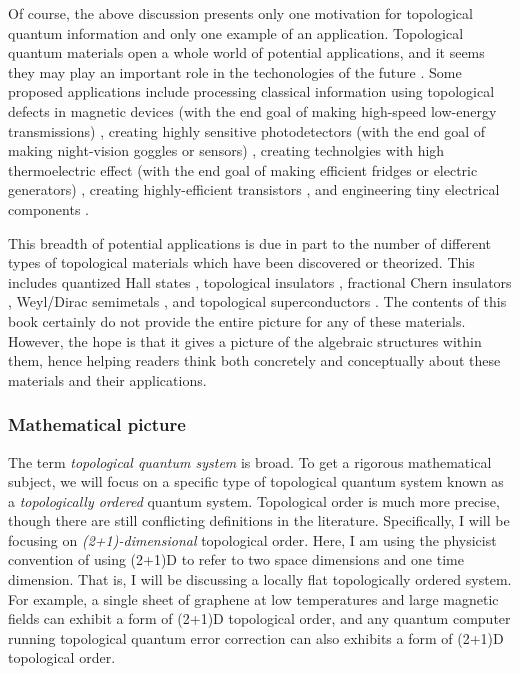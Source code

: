 \documentclass{article}
\theoremstyle{definition}
\numberwithin{figure}{section}
\begin{document}
Of course, the above discussion presents only one motivation for topological quantum information and only one example of an application. Topological quantum materials open a whole world of potential applications, and it seems they may play an important role in the techonologies of the future \cite{ramirez2020dawn}. Some proposed applications include processing classical information using topological defects in magnetic devices (with the end goal of making high-speed low-energy transmissions) \cite{marrows2021perspective, vsmejkal2018topological}, creating highly sensitive photodetectors (with the end goal of making night-vision goggles or sensors) \cite{chan2017photocurrents}, creating technolgies with high thermoelectric effect (with the end goal of making efficient fridges or electric generators) \cite{skinner2018large}, creating highly-efficient transistors \cite{fuhrer2021proposal}, and engineering tiny electrical components \cite{viola2014hall, placke2017model}. 

This breadth of potential applications is due in part to the number of different types of topological materials which have been discovered or theorized. This includes quantized Hall states \cite{von202040}, topological insulators \cite{hasan2010colloquium}, fractional Chern insulators \cite{regnault2011fractional}, Weyl/Dirac semimetals \cite{armitage2018weyl}, and topological superconductors \cite{sato2017topological}. The contents of this book certainly do not provide the entire picture for any of these materials. However, the hope is that it gives a picture of the algebraic structures within them, hence helping readers think both concretely and conceptually about these materials and their applications.

\subsubsection{Mathematical picture}

The term \textit{topological quantum system} is broad. To get a rigorous mathematical subject, we will focus on a specific type of topological quantum system known as a \textit{topologically ordered} quantum system. Topological order is much more precise, though there are still conflicting definitions in the literature. Specifically, I will be focusing on \textit{(2+1)-dimensional} topological order. Here, I am using the physicist convention of using (2+1)D to refer to two space dimensions and one time dimension. That is, I will be discussing a locally flat topologically ordered system. For example, a single sheet of graphene at low temperatures and large magnetic fields can exhibit a form of (2+1)D topological order, and any quantum computer running topological quantum error correction can also exhibits a form of (2+1)D topological order.
\end{document}
